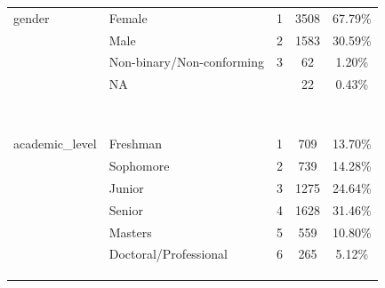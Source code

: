 \documentclass[
  10pt,
]{article}
\begin{document}
\begin{longtable}[t]{llccc}
gender & Female & 1 & 3508 & 67.79\%\\
 & Male & 2 & 1583 & 30.59\%\\
 & Non-binary/Non-conforming & 3 & 62 & 1.20\%\\
 & NA &  & 22 & 0.43\%\\
\cellcolor{gray!6}{total\_income} & \cellcolor{gray!6}{< 10,000} & \cellcolor{gray!6}{1} & \cellcolor{gray!6}{851} & \cellcolor{gray!6}{16.44\%}\\
\cellcolor{gray!6}{} & \cellcolor{gray!6}{10,000-19,999} & \cellcolor{gray!6}{2} & \cellcolor{gray!6}{862} & \cellcolor{gray!6}{16.66\%}\\
\cellcolor{gray!6}{} & \cellcolor{gray!6}{20,000-29,999} & \cellcolor{gray!6}{3} & \cellcolor{gray!6}{806} & \cellcolor{gray!6}{15.57\%}\\
\cellcolor{gray!6}{} & \cellcolor{gray!6}{30,000-39,000} & \cellcolor{gray!6}{4} & \cellcolor{gray!6}{649} & \cellcolor{gray!6}{12.54\%}\\
\cellcolor{gray!6}{} & \cellcolor{gray!6}{40,000-49,999} & \cellcolor{gray!6}{5} & \cellcolor{gray!6}{538} & \cellcolor{gray!6}{10.40\%}\\
\cellcolor{gray!6}{} & \cellcolor{gray!6}{50,000-69,999} & \cellcolor{gray!6}{6} & \cellcolor{gray!6}{651} & \cellcolor{gray!6}{12.58\%}\\
\cellcolor{gray!6}{} & \cellcolor{gray!6}{70,000-99,999} & \cellcolor{gray!6}{7} & \cellcolor{gray!6}{494} & \cellcolor{gray!6}{9.55\%}\\
\cellcolor{gray!6}{} & \cellcolor{gray!6}{>=100,000} & \cellcolor{gray!6}{8} & \cellcolor{gray!6}{324} & \cellcolor{gray!6}{6.26\%}\\
academic\_level & Freshman & 1 & 709 & 13.70\%\\
 & Sophomore & 2 & 739 & 14.28\%\\
 & Junior & 3 & 1275 & 24.64\%\\
 & Senior & 4 & 1628 & 31.46\%\\
 & Masters & 5 & 559 & 10.80\%\\
 & Doctoral/Professional & 6 & 265 & 5.12\%\\
\cellcolor{gray!6}{college/school} & \cellcolor{gray!6}{Business} & \cellcolor{gray!6}{1} & \cellcolor{gray!6}{573} & \cellcolor{gray!6}{11.07\%}\\
\cellcolor{gray!6}{} & \cellcolor{gray!6}{Education} & \cellcolor{gray!6}{2} & \cellcolor{gray!6}{484} & \cellcolor{gray!6}{9.35\%}\\
\cellcolor{gray!6}{} & \cellcolor{gray!6}{Engineering} & \cellcolor{gray!6}{3} & \cellcolor{gray!6}{838} & \cellcolor{gray!6}{16.19\%}\\

\end{longtable}
\end{document}
